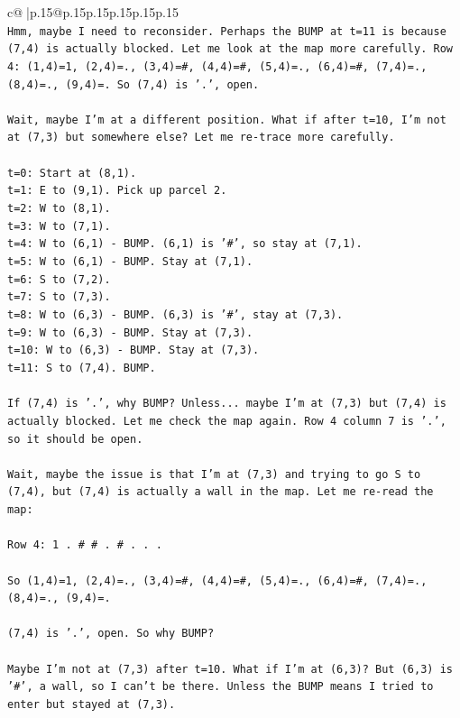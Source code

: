 \documentclass{article}
\begin{document}
{\begin{supertabular}{c@{$\;$}|p{.15\linewidth}@{}p{.15\linewidth}p{.15\linewidth}p{.15\linewidth}p{.15\linewidth}p{.15\linewidth}}
{{{\\ 
\texttt{Hmm, maybe I need to reconsider. Perhaps the BUMP at t=11 is because (7,4) is actually blocked. Let me look at the map more carefully. Row 4: (1,4)=1, (2,4)=., (3,4)=\#, (4,4)=\#, (5,4)=., (6,4)=\#, (7,4)=., (8,4)=., (9,4)=. So (7,4) is '.', open.} \\
\\ 
\texttt{Wait, maybe I'm at a different position. What if after t=10, I'm not at (7,3) but somewhere else? Let me re{-}trace more carefully.} \\
\\ 
\texttt{t=0: Start at (8,1).} \\
\texttt{t=1: E to (9,1). Pick up parcel 2.} \\
\texttt{t=2: W to (8,1).} \\
\texttt{t=3: W to (7,1).} \\
\texttt{t=4: W to (6,1) {-} BUMP. (6,1) is '\#', so stay at (7,1).} \\
\texttt{t=5: W to (6,1) {-} BUMP. Stay at (7,1).} \\
\texttt{t=6: S to (7,2).} \\
\texttt{t=7: S to (7,3).} \\
\texttt{t=8: W to (6,3) {-} BUMP. (6,3) is '\#', stay at (7,3).} \\
\texttt{t=9: W to (6,3) {-} BUMP. Stay at (7,3).} \\
\texttt{t=10: W to (6,3) {-} BUMP. Stay at (7,3).} \\
\texttt{t=11: S to (7,4). BUMP.} \\
\\ 
\texttt{If (7,4) is '.', why BUMP? Unless... maybe I'm at (7,3) but (7,4) is actually blocked. Let me check the map again. Row 4 column 7 is '.', so it should be open.} \\
\\ 
\texttt{Wait, maybe the issue is that I'm at (7,3) and trying to go S to (7,4), but (7,4) is actually a wall in the map. Let me re{-}read the map:} \\
\\ 
\texttt{Row 4: 1 . \# \# . \# . . .} \\
\\ 
\texttt{So (1,4)=1, (2,4)=., (3,4)=\#, (4,4)=\#, (5,4)=., (6,4)=\#, (7,4)=., (8,4)=., (9,4)=.} \\
\\ 
\texttt{(7,4) is '.', open. So why BUMP?} \\
\\ 
\texttt{Maybe I'm not at (7,3) after t=10. What if I'm at (6,3)? But (6,3) is '\#', a wall, so I can't be there. Unless the BUMP means I tried to enter but stayed at (7,3).} \\
}}}
\end{supertabular}}
\end{document}
